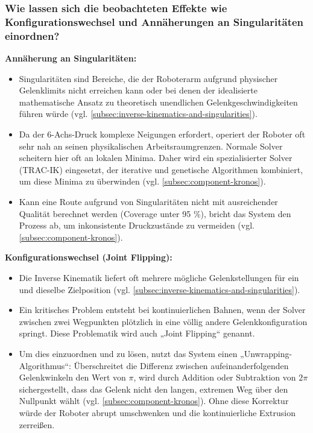       \subsubsection{Wie lassen sich die beobachteten Effekte wie Konfigurationswechsel und Annäherungen an Singularitäten einordnen?}
        \textbf{Annäherung an Singularitäten:}
        \begin{itemize}
        \item Singularitäten sind Bereiche, die der Roboterarm aufgrund physischer Gelenklimits nicht erreichen kann oder bei denen der idealisierte mathematische Ansatz zu theoretisch unendlichen Gelenkgeschwindigkeiten führen würde (vgl. \ref{subsec:inverse-kinematics-and-singularities}).
        \item Da der 6-Achs-Druck komplexe Neigungen erfordert, operiert der Roboter oft sehr nah an seinen physikalischen Arbeitsraumgrenzen.
        Normale Solver scheitern hier oft an lokalen Minima.
        Daher wird ein spezialisierter Solver (TRAC-IK) eingesetzt, der iterative und genetische Algorithmen kombiniert, um diese Minima zu überwinden (vgl. \ref{subsec:component-kronos}).
        \item Kann eine Route aufgrund von Singularitäten nicht mit ausreichender Qualität berechnet werden (Coverage unter 95 \%), bricht das System den Prozess ab, um inkonsistente Druckzustände zu vermeiden (vgl. \ref{subsec:component-kronos}).
        \end{itemize}
        \textbf{Konfigurationswechsel (Joint Flipping):}
        \begin{itemize}
        \item Die Inverse Kinematik liefert oft mehrere mögliche Gelenkstellungen für ein und dieselbe Zielposition (vgl. \ref{subsec:inverse-kinematics-and-singularities}).
        \item Ein kritisches Problem entsteht bei kontinuierlichen Bahnen, wenn der Solver zwischen zwei Wegpunkten plötzlich in eine völlig andere Gelenkkonfiguration springt.
        Diese Problematik wird auch „Joint Flipping“ genannt.
        \item Um dies einzuordnen und zu lösen, nutzt das System einen „Unwrapping-Algorithmus“: Überschreitet die Differenz zwischen aufeinanderfolgenden Gelenkwinkeln den Wert von $\pi$, wird durch Addition oder Subtraktion von $2\pi$ sichergestellt, dass das Gelenk nicht den langen, extremen Weg über den Nullpunkt wählt (vgl. \ref{subsec:component-kronos}).
        Ohne diese Korrektur würde der Roboter abrupt umschwenken und die kontinuierliche Extrusion zerreißen.
        \end{itemize}

